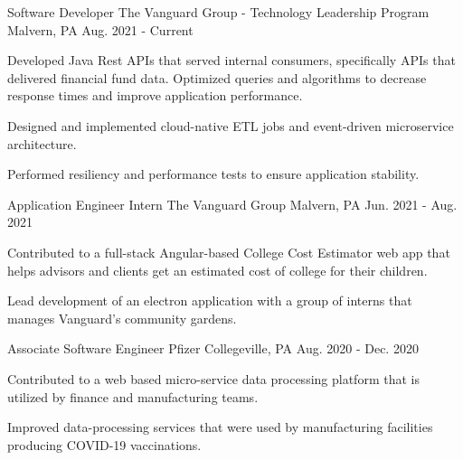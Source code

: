 

\begin{cventries}

  \cventry
    {Software Developer} %
    {The Vanguard Group - Technology Leadership Program} %
    {Malvern, PA} %
    {Aug. 2021 - Current} %
    {
      \begin{cvitems} %
        \item {Developed Java Rest APIs that served internal consumers, specifically APIs that delivered financial fund data. Optimized queries and algorithms to decrease response times and improve application performance.}
        \item {Designed and implemented cloud-native ETL jobs and event-driven microservice architecture.}
        \item {Performed resiliency and performance tests to ensure application stability.}
      \end{cvitems}
    }

  \cventry
    {Application Engineer Intern} %
    {The Vanguard Group} %
    {Malvern, PA} %
    {Jun. 2021 - Aug. 2021} %
    {
      \begin{cvitems} %
        \item {Contributed to a full-stack Angular-based College Cost Estimator web app that helps advisors and clients get an estimated cost of college for their children.}
        \item {Lead development of an electron application with a group of interns that manages Vanguard's community gardens.}
      \end{cvitems}
    }

  \cventry
    {Associate Software Engineer} %
    {Pfizer} %
    {Collegeville, PA} %
    {Aug. 2020 - Dec. 2020} %
    {
      \begin{cvitems} %
        \item {Contributed to a web based micro-service data processing platform that is utilized by finance and manufacturing teams.}
        \item {Improved data-processing services that were used by manufacturing facilities producing COVID-19 vaccinations.}
      \end{cvitems}
    }


\end{cventries}
